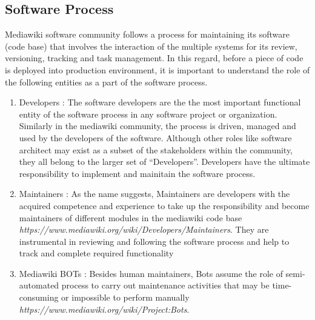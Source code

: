 \subsection{Software Process}
\indent Mediawiki software community follows a process for maintaining its software (code base) that involves the interaction of the multiple systems for its review, versioning, tracking and task management. In this regard, before a piece of code is deployed into production environment, it is important to understand the role of the following entities as a part of the software process. 
\begin{enumerate}
\item Developers : The software developers are the the most important functional entity of the software process in any software project or organization. Similarly in the mediawiki community, the process is driven, managed and used by the developers of the software. Although other roles like software architect may exist as a subset of the stakeholders within the community, they all belong to the larger set of \enquote{Developers}. Developers have the ultimate responsibility to implement and mainitain the software process.
\item Maintainers : As the name suggests, Maintainers are developers with the acquired competence and experience to take up the responsibility and become maintainers of different modules in the mediawiki code base \emph{https://www.mediawiki.org/wiki/Developers/Maintainers}. They are instrumental in reviewing and following the software process and help to track and complete required functionality
\item Mediawiki BOTs : Besides human maintainers, Bots assume the role of semi-automated process to carry out maintenance activities that may be time-consuming or impossible to perform manually \emph{https://www.mediawiki.org/wiki/Project:Bots}.
\end{enumerate}

